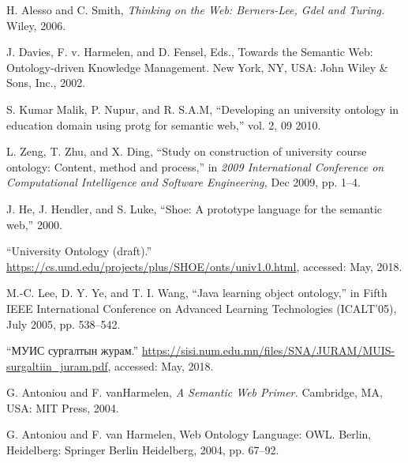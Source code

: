 \documentclass[conference, a4paper, mongolian]{myIEEEtran}
\begin{document}
\begin{thebibliography}{00}
 H. Alesso and C. Smith, \textit{Thinking on the Web: Berners-Lee, Gdel and Turing.} Wiley, 2006.

 J. Davies, F. v. Harmelen, and D. Fensel, Eds., Towards the Semantic Web: Ontology-driven Knowledge Management. New York, NY, USA: John Wiley \& Sons, Inc., 2002.

 S. Kumar Malik, P. Nupur, and R. S.A.M, “Developing an university ontology in education domain using protg for semantic web,” vol. 2, 09 2010.

 L. Zeng, T. Zhu, and X. Ding, “Study on construction of university course ontology: Content, method and process,” in \textit{2009 International Conference on Computational Intelligence and Software Engineering,} Dec 2009, pp. 1–4.

 J. He, J. Hendler, and S. Luke, “Shoe: A prototype language for the semantic web,” 2000.

 “University Ontology (draft).” \url{https://cs.umd.edu/projects/plus/SHOE/onts/univ1.0.html}, accessed: May, 2018.

 M.-C. Lee, D. Y. Ye, and T. I. Wang, “Java learning object ontology,” in Fifth IEEE International Conference on Advanced Learning Technologies (ICALT’05), July 2005, pp. 538–542.

 “МУИС сургалтын журам.” \url{https://sisi.num.edu.mn/files/SNA/JURAM/MUIS-surgaltiin_juram.pdf}, accessed: May, 2018.

 G. Antoniou and F. vanHarmelen, \textit{A Semantic Web Primer.} Cambridge, MA, USA: MIT Press, 2004.

 G. Antoniou and F. van Harmelen, Web Ontology Language: OWL. Berlin, Heidelberg: Springer Berlin Heidelberg, 2004, pp. 67–92.

\end{thebibliography}
%
\end{document}
